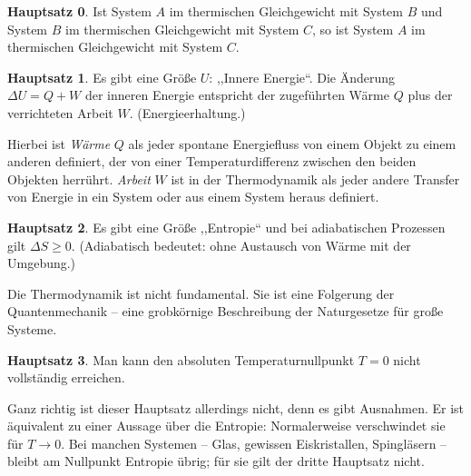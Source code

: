 \begin{center}
\parbox[c][5cm][c]{14cm}{\begin{tcolorbox}[colback=banana,arc=0cm,frame hidden,enhanced]{\textbf{Hauptsatz 0}. Ist System $A$ im thermischen Gleichgewicht mit System $B$ und System $B$ im thermischen Gleichgewicht mit System $C$, so ist System $A$ im thermischen Gleichgewicht mit System $C$.}\end{tcolorbox}}
\end{center}
\begin{center}
\parbox[c][5cm][c]{14cm}{\begin{tcolorbox}[colback=banana,arc=0cm,frame hidden,enhanced]{\textbf{Hauptsatz 1}. Es gibt eine Größe $U$: ,,Innere Energie``. Die Änderung $\Delta U = Q+W$ der inneren Energie entspricht der zugeführten Wärme $Q$ plus der verrichteten Arbeit $W$. (Energieerhaltung.)}\end{tcolorbox}}
\end{center}
Hierbei ist \emph{Wärme} $Q$ als jeder spontane Energiefluss von einem Objekt zu einem anderen definiert, der von einer Temperaturdifferenz zwischen den beiden Objekten herrührt. \emph{Arbeit} $W$ ist in der Thermodynamik als jeder andere Transfer von Energie in ein System oder aus einem System heraus definiert. 
\begin{center}
\parbox[c][5cm][c]{14cm}{\begin{tcolorbox}[colback=banana,arc=0cm,frame hidden,enhanced]{\textbf{Hauptsatz 2}. Es gibt eine Größe ,,Entropie`` und bei adiabatischen Prozessen gilt $\Delta S \ge 0$. (Adiabatisch bedeutet: ohne Austausch von Wärme mit der Umgebung.)}\end{tcolorbox}}
\end{center}
\begin{merksatz}
	Die Thermodynamik ist nicht fundamental. Sie ist eine Folgerung der Quantenmechanik -- eine grobkörnige Beschreibung der Naturgesetze für große Systeme.
\end{merksatz}
\begin{center}
\parbox[c][5cm][c]{14cm}{\begin{tcolorbox}[colback=banana,arc=0cm,frame hidden,enhanced]{\textbf{Hauptsatz 3}. Man kann den absoluten Temperaturnullpunkt $T=0$ nicht vollständig erreichen.}\end{tcolorbox}}
\end{center}

Ganz richtig ist dieser Hauptsatz allerdings nicht, denn es gibt Ausnahmen. Er ist äquivalent zu einer Aussage über die Entropie: Normalerweise verschwindet sie für $T\to 0$. Bei manchen Systemen -- Glas, gewissen Eiskristallen, Spingläsern -- bleibt am Nullpunkt Entropie übrig; für sie gilt der dritte Hauptsatz nicht.
 


